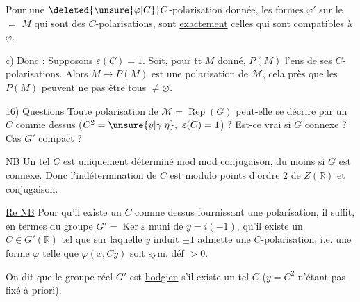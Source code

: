 
Pour  une $\deleted{\unsure{\varphi|C}}C$-polarisation donnée, les formes $\varphi'$ sur le $=$ $M$ qui sont des $C$-polarisations, sont \uline{exactement} celles qui sont compatibles à $\varphi$.

c) Donc : Supposons $\varepsilon(C)=1$. Soit, pour tt $M$ donné, $P(M)$ l'ens de ses $C$-polarisations. Alors $M\mapsto P(M)$ est une polarisation de $\mathcal M$,  cela près que les $P(M)$ peuvent ne pas être tous $\ne\varnothing$.

16) \uline{Questions} Toute polarisation de  $\mathcal M=\operatorname{Rep}(G)$ peut-elle se décrire par un $C$ comme dessus ($C^2=\unsure{y|\gamma|\eta},\ \varepsilon(C)=1$) ? Est-ce vrai si $G$ connexe ? Cas $G'$  compact ?


\uline{NB} Un tel $C$  est uniquement déterminé mod   mod conjugaison,  du moins si $G$ est connexe. Donc  l'indétermination de $C$  est modulo points d'ordre $2$ de $Z(\mathbb R)$ et conjugaison.

\uline{Re NB} Pour qu'il existe un $C$ comme dessus fournissant une polarisation, il  suffit, en termes du groupe $G'=\operatorname{Ker}\varepsilon$ muni de $y=i(-1)$, qu'il existe un $C\in G'(\mathbb R)$ tel que \uline{}   sur laquelle $y$ induit $\pm1$ admette une $C$-polarisation, i.e. une forme  $\varphi$ telle que $\varphi(x,Cy)$ soit sym. déf $>0$.

On dit que le groupe  réel $G'$ est \uline{hodgien} s'il existe un tel $C$   ($y=C^2$ n'étant pas fixé à priori).

